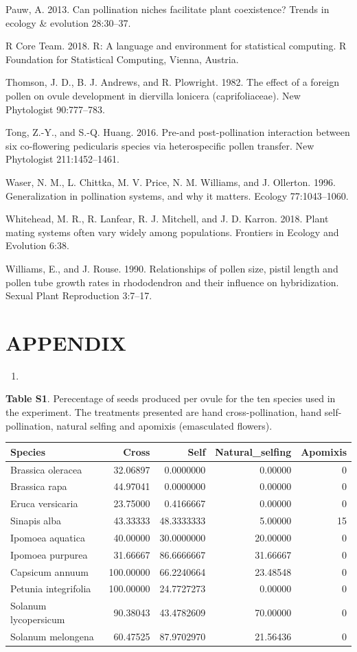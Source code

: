 \documentclass[11pt,a4paper]{article}
\begin{document}
\hypertarget{ref-pauw2013}{}
Pauw, A. 2013. Can pollination niches facilitate plant coexistence?
Trends in ecology \& evolution 28:30--37.

\hypertarget{ref-R_Core_Team_2018}{}
R Core Team. 2018. R: A language and environment for statistical
computing. R Foundation for Statistical Computing, Vienna, Austria.

\hypertarget{ref-thomson1982}{}
Thomson, J. D., B. J. Andrews, and R. Plowright. 1982. The effect of a
foreign pollen on ovule development in diervilla lonicera
(caprifoliaceae). New Phytologist 90:777--783.

\hypertarget{ref-tong2016}{}
Tong, Z.-Y., and S.-Q. Huang. 2016. Pre-and post-pollination interaction
between six co-flowering pedicularis species via heterospecific pollen
transfer. New Phytologist 211:1452--1461.

\hypertarget{ref-waser1996}{}
Waser, N. M., L. Chittka, M. V. Price, N. M. Williams, and J. Ollerton.
1996. Generalization in pollination systems, and why it matters. Ecology
77:1043--1060.

\hypertarget{ref-whitehead2018}{}
Whitehead, M. R., R. Lanfear, R. J. Mitchell, and J. D. Karron. 2018.
Plant mating systems often vary widely among populations. Frontiers in
Ecology and Evolution 6:38.

\hypertarget{ref-williams1990}{}
Williams, E., and J. Rouse. 1990. Relationships of pollen size, pistil
length and pollen tube growth rates in rhododendron and their influence
on hybridization. Sexual Plant Reproduction 3:7--17.

\section{APPENDIX}\label{appendix}

\begin{enumerate}
\def\labelenumi{\arabic{enumi}.}
\item
\end{enumerate}

\textbf{Table S1}. Perecentage of seeds produced per ovule for the ten
species used in the experiment. The treatments presented are hand
cross-pollination, hand self-pollination, natural selfing and apomixis
(emasculated flowers).

\begin{longtable}[]{@{}lrrrr@{}}
\toprule
Species & Cross & Self & Natural\_selfing & Apomixis\tabularnewline
\midrule
\endhead
Brassica oleracea & 32.06897 & 0.0000000 & 0.00000 & 0\tabularnewline
Brassica rapa & 44.97041 & 0.0000000 & 0.00000 & 0\tabularnewline
Eruca versicaria & 23.75000 & 0.4166667 & 0.00000 & 0\tabularnewline
Sinapis alba & 43.33333 & 48.3333333 & 5.00000 & 15\tabularnewline
Ipomoea aquatica & 40.00000 & 30.0000000 & 20.00000 & 0\tabularnewline
Ipomoea purpurea & 31.66667 & 86.6666667 & 31.66667 & 0\tabularnewline
Capsicum annuum & 100.00000 & 66.2240664 & 23.48548 & 0\tabularnewline
Petunia integrifolia & 100.00000 & 24.7727273 & 0.00000 &
0\tabularnewline
Solanum lycopersicum & 90.38043 & 43.4782609 & 70.00000 &
0\tabularnewline
Solanum melongena & 60.47525 & 87.9702970 & 21.56436 & 0\tabularnewline
\bottomrule
\end{longtable}
\end{document}
